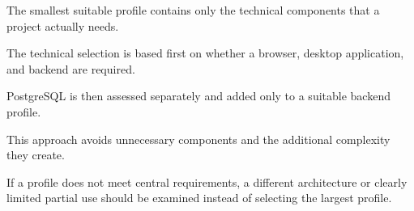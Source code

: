 \begin{beginnerstatement}

The smallest suitable profile contains only the technical components that a
project actually needs.

The technical selection is based first on whether a browser, desktop
application, and backend are required.

PostgreSQL is then assessed separately and added only to a suitable backend
profile.

This approach avoids unnecessary components and the additional complexity
they create.

If a profile does not meet central requirements, a different architecture or
clearly limited partial use should be examined instead of selecting the
largest profile.

\end{beginnerstatement}
